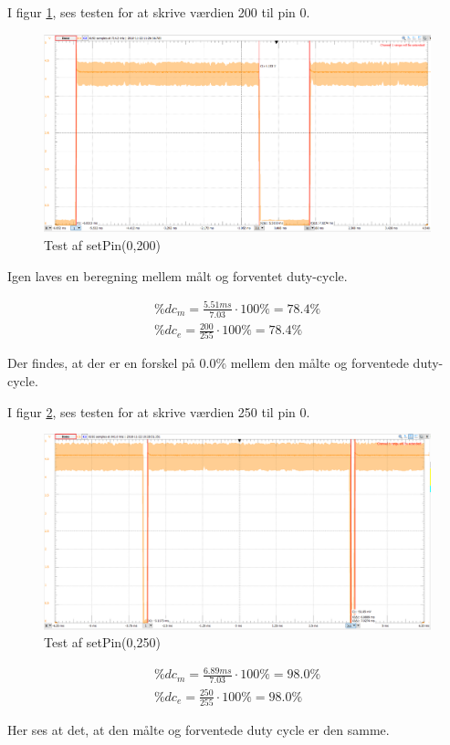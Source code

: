 \documentclass[Modultest/Modultest_main.tex]{subfiles}
\begin{document}
I figur \ref{fig:test_200_pin_0}, ses testen for at skrive værdien 200 til pin 0.
\begin{figure}[H]
    \centering
    \includegraphics[width=\textwidth]{Modultest/CupLight/graphics/pwm_200.png}
    \caption{Test af setPin(0,200)}
    \label{fig:test_200_pin_0}
\end{figure}
Igen laves en beregning mellem målt og forventet duty-cycle.
\begin{subequation}
\begin{align}
    \%dc_m=\frac{5.51ms}{7.03}\cdot 100\% = 78.4\%
    \\\%dc_e=\frac{200}{255}\cdot 100\% = 78.4\%
\end{align}
\end{subequation}
Der findes, at der er en forskel på 0.0\% mellem den målte og forventede duty-cycle.

I figur \ref{fig:test_250_pin_0}, ses testen for at skrive værdien 250 til pin 0.
\begin{figure}[H]
    \centering
    \includegraphics[width=\textwidth]{Modultest/CupLight/graphics/pwm_250.png}
    \caption{Test af setPin(0,250)}
    \label{fig:test_250_pin_0}
\end{figure}
\begin{subequation}
\begin{align}
    \%dc_m=\frac{6.89ms}{7.03}\cdot 100\% = 98.0\%
    \\\%dc_e=\frac{250}{255}\cdot 100\% = 98.0\%
\end{align}
\end{subequation}
Her ses at det, at den målte og forventede duty cycle er den samme.
\end{document}
